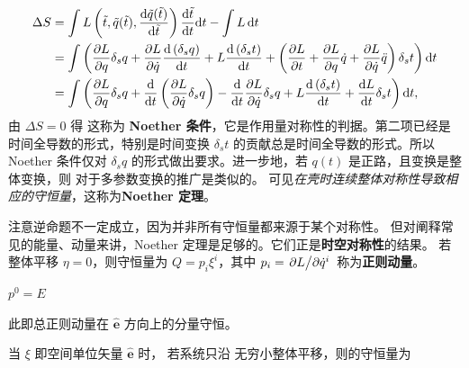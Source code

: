 \begin{align*}  \Delta S &=\int  L\left(\tilde{t}, \tilde{q}(\tilde{t}), \frac{\mathrm{d} \tilde{q}(\tilde{t})}{\mathrm{d} \tilde{t}}\right) \frac{\mathrm{d} \tilde{t}}{\mathrm{d} t} \dd t-\int  L\,\dd t \\& =\int \left(\frac{\partial L}{\partial q} \delta_s q+\frac{\partial L}{\partial \dot{q}} \frac{\mathrm{d}\left(\delta_s q\right)}{\mathrm{d} t}+L \frac{\mathrm{d}\left(\delta_s t\right)}{\mathrm{d} t}  +\left(\frac{\partial L}{\partial t}+\frac{\partial L}{\partial q} \dot{q}+\frac{\partial L}{\partial \dot{q}} \ddot{q}\right) \delta_s t\right)\dd t \\ & =\int \left(\frac{\partial L}{\partial q} \delta_s q+\frac{\mathrm{d}}{\mathrm{d} t}\left(\frac{\partial L}{\partial \dot{q}} \delta_s q\right)-\frac{\mathrm{d}}{\mathrm{d} t} \frac{\partial L}{\partial \dot{q}} \delta_s q+L \frac{\mathrm{d}\left(\delta_s t\right)}{\mathrm{d} t}  +\frac{\mathrm{d} L}{\mathrm{d} t} \delta_s t\right)\dd t,
\end{align*}
由 $\Delta S=0$ 得
这称为 \textbf{Noether 条件}，它是作用量对称性的判据。第二项已经是时间全导数的形式，特别是时间变换 $\delta_s t$ 的贡献总是时间全导数的形式。所以 Noether 条件仅对 $\delta_s q$ 的形式做出要求。进一步地，若 $q(t)$ 是正路，且变换是整体变换，则
对于多参数变换的推广是类似的。
可见\textit{在壳时连续整体对称性导致相应的守恒量}，这称为\textbf{Noether 定理}。

注意逆命题不一定成立，因为并非所有守恒量都来源于某个对称性。
但对阐释常见的能量、动量来讲，Noether 定理是足够的。它们正是\textbf{时空对称性}的结果。
若整体平移 $\eta=0$，则守恒量为 $Q=p_i \xi^i$，其中 $p_i=\pdv*{L}{\dot{q}^i}$ 称为\textbf{正则动量}。

$p^0=E$

此即总正则动量在 $\hat{\bm e}$ 方向上的分量守恒。

当 $\xi$ 即空间单位矢量 $\hat{\bm e}$ 时，
若系统只沿 无穷小整体平移，则的守恒量为

